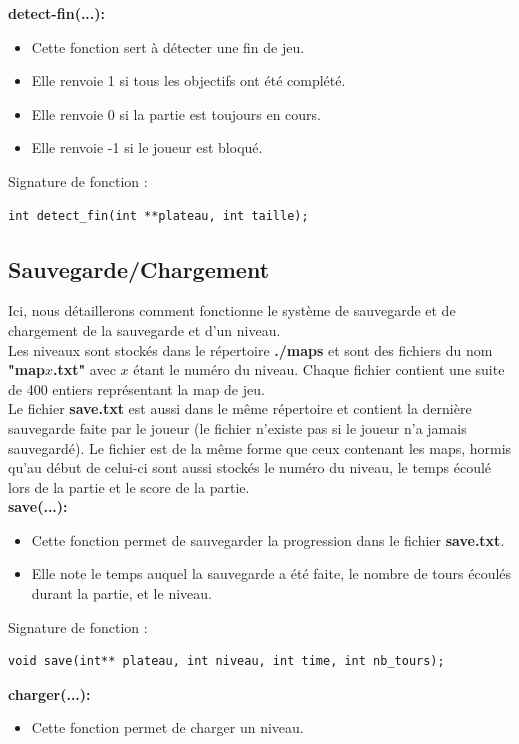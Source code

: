 \documentclass{article}
\begin{document}
\textbf{detect-fin(...):}
\begin{itemize}
\item Cette fonction sert à détecter une fin de jeu.
\item Elle renvoie 1 si tous les objectifs ont été complété.
\item Elle renvoie 0 si la partie est toujours en cours.
\item Elle renvoie -1 si le joueur est bloqué.
\end{itemize}
Signature de fonction :
\begin{lstlisting}
int detect_fin(int **plateau, int taille);
\end{lstlisting}


\newpage

\subsection{Sauvegarde/Chargement}
Ici, nous détaillerons comment fonctionne le système de sauvegarde et de chargement de la sauvegarde et d'un niveau.\\
Les niveaux sont stockés dans le répertoire \textbf{./maps} et sont des fichiers du nom \textbf{"map$x$.txt"} avec $x$ étant le numéro du niveau. Chaque fichier contient une suite de 400 entiers représentant la map de jeu.\\
Le fichier \textbf{save.txt} est aussi dans le même répertoire et contient la dernière sauvegarde faite par le joueur (le fichier n'existe pas si le joueur n'a jamais sauvegardé). Le fichier est de la même forme que ceux contenant les maps, hormis qu'au début de celui-ci sont aussi stockés le numéro du niveau, le temps écoulé lors de la partie et le score de la partie.\\
\newline
\textbf{save(...):}
\begin{itemize}
\item Cette fonction permet de sauvegarder la progression dans le fichier \textbf{save.txt}.
\item Elle note le temps auquel la sauvegarde a été faite, le nombre de tours écoulés durant la partie, et le niveau.
\end{itemize}
Signature de fonction :
\begin{lstlisting}
void save(int** plateau, int niveau, int time, int nb_tours);
\end{lstlisting}
\textbf{charger(...):}
\begin{itemize}
\item Cette fonction permet de charger un niveau.
\end{itemize}
\end{document}
